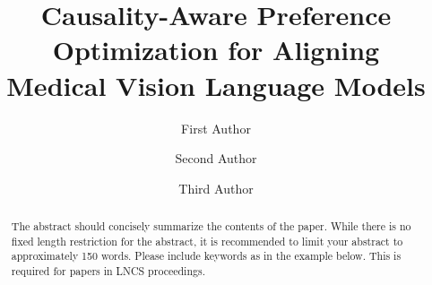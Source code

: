 \documentclass[runningheads]{llncs}
\begin{document}
\title{ Causality-Aware Preference Optimization for Aligning \\Medical Vision Language Models} 


\author{First Author \and
Second Author \and
Third Author}



\maketitle

     
 
 
 
 
 
 
 {\small


}
 


\iffalse
\begin{abstract}
  The abstract should concisely summarize the contents of the paper. 
  While there is no fixed length restriction for the abstract, it is recommended to limit your abstract to approximately 150 words.
  Please include keywords as in the example below. 
  This is required for papers in LNCS proceedings.
\end{abstract}
\end{document}
